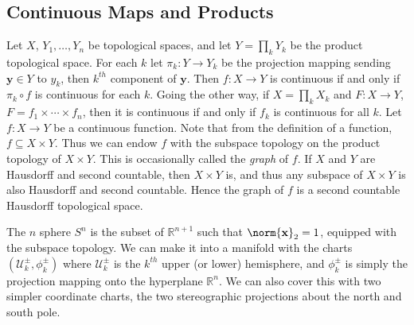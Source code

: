 \documentclass{article}                                                        %
\begin{document}
            \subsection{Continuous Maps and Products}
                Let $X$, $Y_{1},\dots,Y_{n}$ be topological spaces, and let
                $Y=\prod_{k}Y_{k}$ be the product topological space. For each
                $k$ let $\pi_{k}:Y\rightarrow{Y}_{k}$ be the projection mapping
                sending $\mathbf{y}\in{Y}$ to $y_{k}$, then $k^{th}$ component
                of $\mathbf{y}$. Then $f:X\rightarrow{Y}$ is continuous if and
                only if $\pi_{k}\circ{f}$ is continuous for each $k$. Going the
                other way, if $X=\prod_{k}X_{k}$ and $F:X\rightarrow{Y}$,
                $F=f_{1}\times\cdots\times{f}_{n}$, then it is continuous if and
                only if $f_{k}$ is continuous for all $k$. Let
                $f:X\rightarrow{Y}$ be a continuous function. Note that from the
                definition of a function, $f\subseteq{X}\times{Y}$. Thus we can
                endow $f$ with the subspace topology on the product topology of
                $X\times{Y}$. This is occasionally called the \textit{graph} of
                $f$. If $X$ and $Y$ are Hausdorff and second countable, then
                $X\times{Y}$ is, and thus any subspace of $X\times{Y}$ is
                also Hausdorff and second countable. Hence the graph of $f$ is
                a second countable Hausdorff topological space.
                \begin{example}
                    The $n$ sphere $S^{n}$ is the subset of $\mathbb{R}^{n+1}$
                    such that $\norm{\mathbf{x}}_{2}=1$, equipped with the
                    subspace topology. We can make it into a manifold with the
                    charts $(\mathcal{U}_{k}^{\pm},\phi_{k}^{\pm})$ where
                    $\mathcal{U}_{k}^{\pm}$ is the $k^{th}$ upper (or lower)
                    hemisphere, and $\phi_{k}^{\pm}$ is simply the projection
                    mapping onto the hyperplane $\mathbb{R}^{n}$. We can also
                    cover this with two simpler coordinate charts, the
                    two stereographic projections about the north and south
                    pole.
                \end{example}
\end{document}
